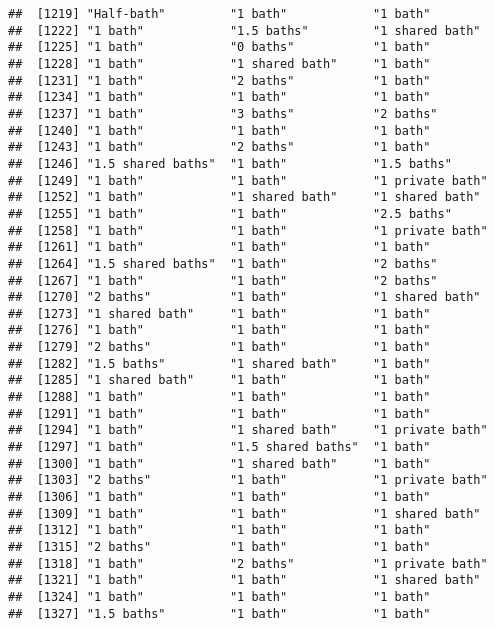 \documentclass[
]{article}
\begin{document}
\begin{verbatim}
##  [1219] "Half-bath"         "1 bath"            "1 bath"           
##  [1222] "1 bath"            "1.5 baths"         "1 shared bath"    
##  [1225] "1 bath"            "0 baths"           "1 bath"           
##  [1228] "1 bath"            "1 shared bath"     "1 bath"           
##  [1231] "1 bath"            "2 baths"           "1 bath"           
##  [1234] "1 bath"            "1 bath"            "1 bath"           
##  [1237] "1 bath"            "3 baths"           "2 baths"          
##  [1240] "1 bath"            "1 bath"            "1 bath"           
##  [1243] "1 bath"            "2 baths"           "1 bath"           
##  [1246] "1.5 shared baths"  "1 bath"            "1.5 baths"        
##  [1249] "1 bath"            "1 bath"            "1 private bath"   
##  [1252] "1 bath"            "1 shared bath"     "1 shared bath"    
##  [1255] "1 bath"            "1 bath"            "2.5 baths"        
##  [1258] "1 bath"            "1 bath"            "1 private bath"   
##  [1261] "1 bath"            "1 bath"            "1 bath"           
##  [1264] "1.5 shared baths"  "1 bath"            "2 baths"          
##  [1267] "1 bath"            "1 bath"            "2 baths"          
##  [1270] "2 baths"           "1 bath"            "1 shared bath"    
##  [1273] "1 shared bath"     "1 bath"            "1 bath"           
##  [1276] "1 bath"            "1 bath"            "1 bath"           
##  [1279] "2 baths"           "1 bath"            "1 bath"           
##  [1282] "1.5 baths"         "1 shared bath"     "1 bath"           
##  [1285] "1 shared bath"     "1 bath"            "1 bath"           
##  [1288] "1 bath"            "1 bath"            "1 bath"           
##  [1291] "1 bath"            "1 bath"            "1 bath"           
##  [1294] "1 bath"            "1 shared bath"     "1 private bath"   
##  [1297] "1 bath"            "1.5 shared baths"  "1 bath"           
##  [1300] "1 bath"            "1 shared bath"     "1 bath"           
##  [1303] "2 baths"           "1 bath"            "1 private bath"   
##  [1306] "1 bath"            "1 bath"            "1 bath"           
##  [1309] "1 bath"            "1 bath"            "1 shared bath"    
##  [1312] "1 bath"            "1 bath"            "1 bath"           
##  [1315] "2 baths"           "1 bath"            "1 bath"           
##  [1318] "1 bath"            "2 baths"           "1 private bath"   
##  [1321] "1 bath"            "1 bath"            "1 shared bath"    
##  [1324] "1 bath"            "1 bath"            "1 bath"           
##  [1327] "1.5 baths"         "1 bath"            "1 bath"           

\end{verbatim}
\end{document}
